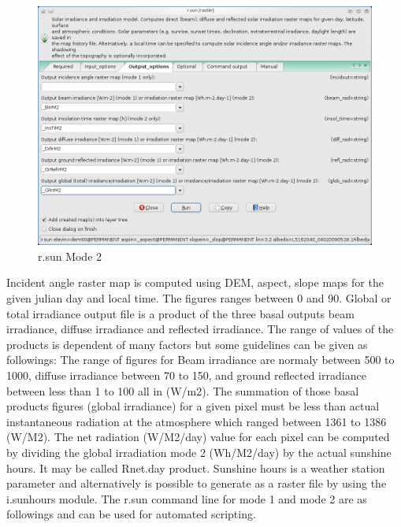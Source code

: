 \begin{figure}[htbp]
   \centering
   \includegraphics[scale=0.3]{gipe025a.png}
   \caption{r.sun Mode 2}
   \label{fig:gipe025a}
\end{figure}

Incident angle raster map is computed using DEM, aspect, slope maps for the given julian day and local time. The figures ranges between 0 and 90.\newline
Global or total irradiance output file is a product of the three basal outputs beam irradiance, diffuse irradiance and reflected irradiance. \newline
The range of values of the products is dependent of many factors but some guidelines can be given as followings:\newline\linebreak
The range of figures for Beam irradiance are normaly between 500 to 1000, diffuse irradiance between 70 to 150, and ground reflected irradiance between less than 1 to 100 all in (W/m2).\newline
The summation of those basal products figures (global irradiance) for a given pixel must be less than actual instantaneous radiation at the atmosphere which ranged between 1361 to 1386 (W/M2).\newline\linebreak
The net radiation (W/M2/day) value for each pixel can be computed by dividing the global irradiation mode 2 (Wh/M2/day) by the actual sunshine hours. It may be called Rnet.day product.\newline
Sunshine hours is a weather station parameter and alternatively is possible to generate as a raster file by using the i.sunhours module.\newline\linebreak
The r.sun command line for mode 1 and mode 2 are as followings and can be used for automated scripting.\newline\linebreak

